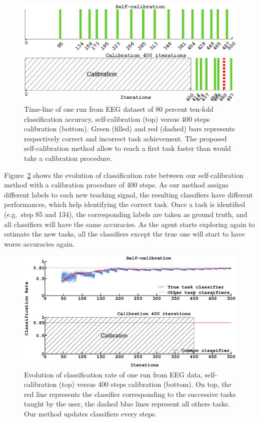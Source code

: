 \begin{figure}[!ht]
\centering
\includegraphics[width=\columnwidth]{img/plots_aaai/plot_the_aaai_sequence.eps}
\caption{Time-line of one run from EEG dataset of $80$ percent ten-fold classification accuracy, self-calibration (top) versus 400 steps calibration (bottom). Green (filled) and red (dashed) bars represents respectively correct and incorrect task achievement. The proposed self-calibration method allow to reach a first task faster than would take a calibration procedure.}
\label{fig:sequence}
\end{figure} 



Figure~\ref{fig:sequence_evolution} shows the evolution of classification rate between our self-calibration method with a calibration procedure of 400 steps. As our method assigns different labels to each new teaching signal, the resulting classifiers have different performances, which help identifying the correct task. Once a task is identified (e.g.\ step 85 and 134), the corresponding labels are taken as ground truth, and all classifiers will have the same accuracies. As the agent starts exploring again to estimate the new tasks, all the classifiers except the true one will start to have worse accuracies again.

\begin{figure}[!ht]
\centering
\includegraphics[width=\columnwidth]{img/plots_aaai/plot_evo_classification_rate.eps}
\caption{Evolution of classification rate of one run from EEG data, self-calibration (top) versus 400 steps calibration (bottom). On top, the red line represents the classifier corresponding to the successive tasks taught by the user, the dashed blue lines represent all others tasks. Our method updates classifiers every steps.}
\label{fig:sequence_evolution}
\end{figure} 


